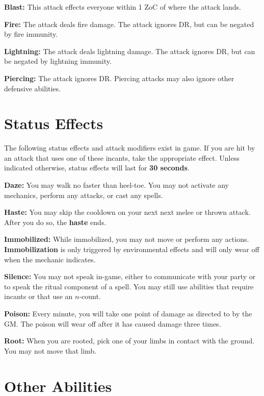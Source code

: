\documentclass[green]{grimrock}
\begin{document}
{\bf Blast:} This attack effects everyone within 1 ZoC of where the attack lands.

{\bf Fire:} The attack deals fire damage.  The attack ignores DR, but can be negated by fire immunity.

{\bf Lightning:} The attack deals lightning damage.  The attack ignores DR, but can be negated by lightning immunity.

{\bf Piercing:} The attack ignores DR.  Piercing attacks may also ignore other defensive abilities.


\section{Status Effects}

The following status effects and attack modifiers exist in game.  If you are hit by an attack that uses one of these incants, take the appropriate effect.  Unless indicated otherwise, status effects will last for {\bf 30 seconds}.

{\bf Daze:} You may walk no faster than heel-toe.  You may not activate any mechanics, perform any attacks, or cast any spells.


{\bf Haste:} You may skip the cooldown on your next next melee or thrown attack.  After you do so, the {\bf haste} ends.

{\bf Immobilized:}  While immobilized, you may not move or perform any actions.  {\bf Immobilization} is only triggered by environmental effects and will only wear off when the mechanic indicates.

{\bf Silence:} You may not speak in-game, either to communicate with your party or to speak the ritual component of a spell.  You may still use abilities that require incants or that use an $n$-count.

{\bf Poison:}  Every minute, you will take one point of damage as directed to by the GM.  The poison will wear off after it has caused damage three times.

{\bf Root:} When you are rooted, pick one of your  limbs in contact with the ground.  You may not move that limb.

\section{Other Abilities}





\end{document}

